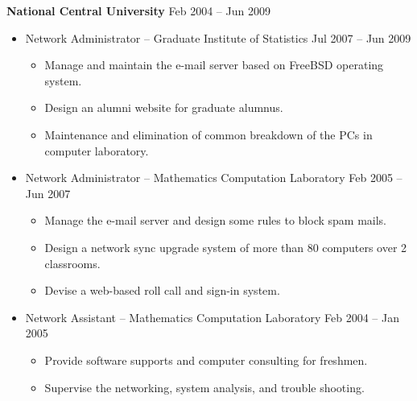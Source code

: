 \documentclass[a4paper,10pt,dvipdfmx]{article}
\begin{document}
\textbf{National Central University} \hfill Feb 2004 -- Jun 2009
\begin{itemize}[noitemsep,nolistsep]
  \item[] Network Administrator -- Graduate Institute of Statistics \hfill Jul 2007 -- Jun 2009
    \begin{itemize}[noitemsep,nolistsep]
      \item Manage and maintain the e-mail server based on FreeBSD operating system.
      \item Design an alumni website for graduate alumnus.
      \item Maintenance and elimination of common breakdown of the PCs in computer laboratory.
    \end{itemize}
  \item[] Network Administrator -- Mathematics Computation Laboratory \hfill Feb 2005 -- Jun 2007
    \begin{itemize}[noitemsep,nolistsep]
      \item Manage the e-mail server and design some rules to block spam mails.
      \item Design a network sync upgrade system of more than 80 computers over 2 classrooms.
      \item Devise a web-based roll call and sign-in system.
    \end{itemize}
  \item[] Network Assistant -- Mathematics Computation Laboratory \hfill Feb 2004 -- Jan 2005
    \begin{itemize}[noitemsep,nolistsep]
      \item Provide software supports and computer consulting for freshmen.
      \item Supervise the networking, system analysis, and trouble shooting.
    \end{itemize}
\end{itemize}

\newpage
\end{document}
